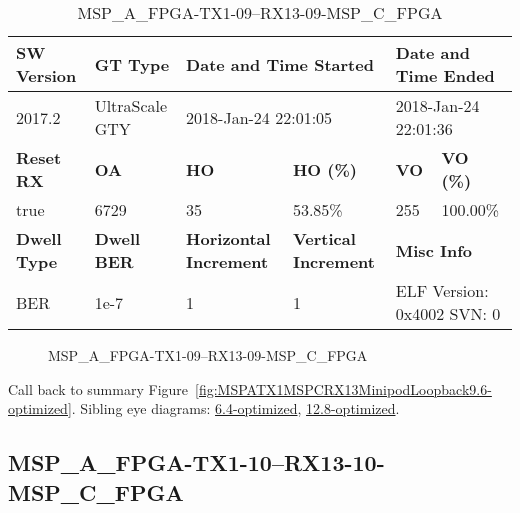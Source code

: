 \begin{table}[h]
\centering
\caption{MSP\_A\_FPGA-TX1-09--RX13-09-MSP\_C\_FPGA}
\label{tab:MSPAFPGATX109RX1309MSPCFPGA9.6-optimized}
\begin{tabular}{@{}|l|l|l|l|l|l|@{}}
\toprule
\textbf{SW Version}                & \textbf{GT Type}   & \multicolumn{2}{l|}{\textbf{Date and Time Started}}            & \multicolumn{2}{l|}{\textbf{Date and Time Ended}}        \\ \midrule
2017.2                       & UltraScale GTY          & \multicolumn{2}{l|}{2018-Jan-24 22:01:05}                   & \multicolumn{2}{l|}{2018-Jan-24 22:01:36}               \\ \midrule
\textbf{Reset RX}                  & \textbf{OA} & \textbf{HO}   & \textbf{HO (\%)} & \textbf{VO} & \textbf{VO (\%)} \\ \midrule
true & 6729        & 35          & 53.85\%        & 255        & 100.00\%       \\ \midrule
\textbf{Dwell Type}                & \textbf{Dwell BER} & \textbf{Horizontal Increment} & \textbf{Vertical Increment}    & \multicolumn{2}{l|}{\textbf{Misc Info}}                  \\ \midrule
BER                            & 1e-7        & 1        & 1           & \multicolumn{2}{l|}{ELF Version: 0x4002 SVN: 0}                         \\ \bottomrule
\end{tabular}
\end{table}

\begin{figure}[h]
\caption{MSP\_A\_FPGA-TX1-09--RX13-09-MSP\_C\_FPGA} \label{fig:MSPAFPGATX109RX1309MSPCFPGA9.6-optimized}
\end{figure}

Call back to summary Figure~\ref{fig:MSPATX1MSPCRX13MinipodLoopback9.6-optimized}.
Sibling eye diagrams: \hyperref[sec:MSPAFPGATX109RX1309MSPCFPGA6.4-optimized]{6.4-optimized}, \hyperref[sec:MSPAFPGATX109RX1309MSPCFPGA12.8-optimized]{12.8-optimized}.

\clearpage
\newpage


\subsection{MSP\_A\_FPGA-TX1-10--RX13-10-MSP\_C\_FPGA}\label{sec:MSPAFPGATX110RX1310MSPCFPGA9.6-optimized}

